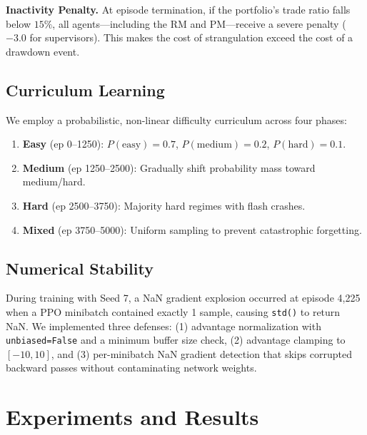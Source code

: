 \documentclass[11pt]{article}
\begin{document}
\textbf{Inactivity Penalty.} At episode termination, if the portfolio's trade ratio falls below $15\%$, all agents---including the RM and PM---receive a severe penalty ($-3.0$ for supervisors). This makes the cost of strangulation exceed the cost of a drawdown event.

\subsection{Curriculum Learning}
We employ a probabilistic, non-linear difficulty curriculum across four phases:
\begin{enumerate}[leftmargin=*]
    \item \textbf{Easy} (ep 0--1250): $P(\text{easy})=0.7$, $P(\text{medium})=0.2$, $P(\text{hard})=0.1$.
    \item \textbf{Medium} (ep 1250--2500): Gradually shift probability mass toward medium/hard.
    \item \textbf{Hard} (ep 2500--3750): Majority hard regimes with flash crashes.
    \item \textbf{Mixed} (ep 3750--5000): Uniform sampling to prevent catastrophic forgetting.
\end{enumerate}

\subsection{Numerical Stability}
During training with Seed 7, a NaN gradient explosion occurred at episode 4{,}225 when a PPO minibatch contained exactly 1 sample, causing \texttt{std()} to return NaN. We implemented three defenses: (1) advantage normalization with \texttt{unbiased=False} and a minimum buffer size check, (2) advantage clamping to $[-10, 10]$, and (3) per-minibatch NaN gradient detection that skips corrupted backward passes without contaminating network weights.

\section{Experiments and Results}
\label{sec:experiments}
\end{document}
